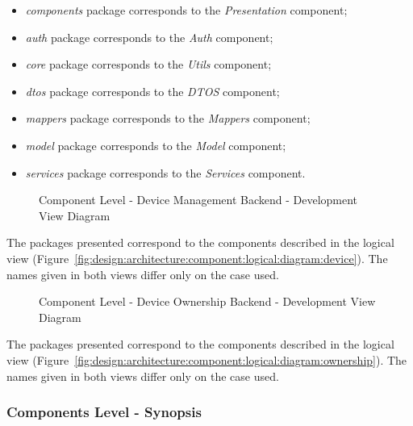 \begin{itemize}
   \item \textit{components} package corresponds to the \textit{Presentation} component;
   \item \textit{auth} package corresponds to the \textit{Auth} component;
   \item \textit{core} package corresponds to the \textit{Utils} component;
   \item \textit{dtos} package corresponds to the \textit{DTOS} component;
   \item \textit{mappers} package corresponds to the \textit{Mappers} component;
   \item \textit{model} package corresponds to the \textit{Model} component;
   \item \textit{services} package corresponds to the \textit{Services} component.
\end{itemize}

\begin{figure}[H]
   \centering
   \resizebox{\columnwidth}{!}
   {
      
   }
   \caption[Component Level - Device Management Backend - Development View Diagram]{Component Level - Device Management Backend - Development View Diagram}
   \label{fig:design:architecture:component:development:diagram:device}
\end{figure}

The packages presented correspond to the components described in the logical view (Figure~\ref{fig:design:architecture:component:logical:diagram:device}). The names given in both views differ only on the case used.

\begin{figure}[H]
   \centering
   \resizebox{\columnwidth}{!}
   {
      
   }
   \caption[Component Level - Device Ownership Backend - Development View Diagram]{Component Level - Device Ownership Backend - Development View Diagram}
   \label{fig:design:architecture:component:development:diagram:ownership}
\end{figure}

The packages presented correspond to the components described in the logical view (Figure~\ref{fig:design:architecture:component:logical:diagram:ownership}). The names given in both views differ only on the case used.

\subsubsection{Components Level - Synopsis}
\label{subsubsec:design:architecture:components:synopsis}

